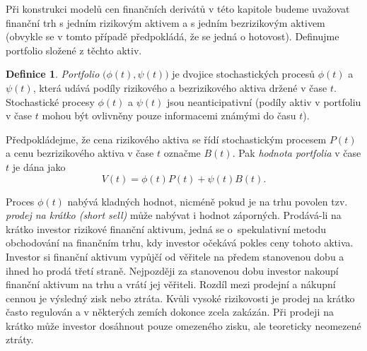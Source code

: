 \documentclass[a4paper,12pt]{report}
\theoremstyle{definition} \newtheorem{definice}[veta]{Definice}
\theoremstyle{remark}
\begin{document}
Při konstrukci modelů cen finančních derivátů v této kapitole budeme uvažovat finanční trh s jedním rizikovým aktivem a s jedním bezrizikovým aktivem (obvykle se v tomto případě předpokládá, že se jedná o hotovost).
Definujme portfolio složené z těchto aktiv.
\begin{definice}
\textit{Portfolio} $\big(\phi(t),\psi(t)\big)$ je dvojice stochastických procesů $\phi(t)$ a $\psi(t)$, která udává podíly rizikového a bezrizikového aktiva držené v čase $t$.
Stochastické procesy  $\phi(t)$ a $\psi(t)$ jsou neanticipativní (podíly aktiv v portfoliu v čase $t$ mohou být ovlivněny pouze informacemi známými do času $t$).

Předpokládejme, že cena rizikového aktiva se řídí stochastickým procesem $P(t)$ a cenu bezrizikového aktiva v čase $t$ označme $B(t)$.
Pak \textit{hodnota portfolia} v čase $t$ je dána jako
\begin{equation}\label{hodnota_portfolia}
V(t)=\phi(t)P(t)+\psi(t)B(t).
\end{equation}
\end{definice}

Proces $\phi(t)$  nabývá kladných hodnot, nicméně pokud je na trhu povolen tzv. \textit{prodej na krátko (short sell)} může nabývat i hodnot záporných.
Prodává-li na krátko investor rizikové finanční aktivum, jedná se o~spekulativní metodu obchodování na finančním trhu, kdy investor očekává pokles ceny tohoto aktiva.
Investor si finanční aktivum vypůjčí od věřitele na předem stanovenou dobu a ihned ho prodá třetí straně.
Nejpozději za stanovenou dobu investor nakoupí finanční aktivum na trhu a vrátí jej věřiteli.
Rozdíl mezi prodejní a nákupní cennou je výsledný zisk nebo ztráta.
Kvůli vysoké rizikovosti je prodej na krátko často regulován a v některých zemích dokonce zcela zakázán.
Při prodeji na krátko může investor dosáhnout pouze omezeného zisku, ale teoreticky neomezené ztráty.


\end{document}
